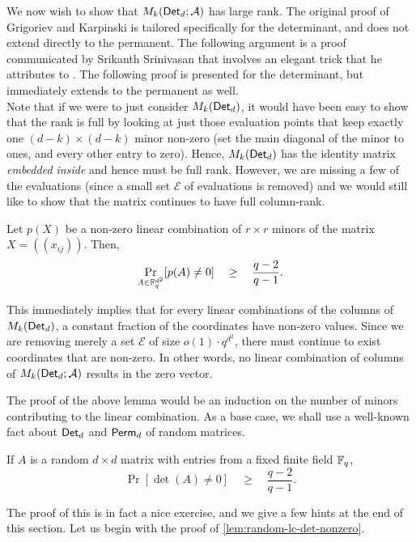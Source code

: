 We now wish to show that $M_k(\operatorname{\mathsf{Det}}_d;\mathcal{A})$ has large rank. 
The
original proof of Grigoriev and Karpinski is tailored specifically for
the determinant, and does not extend directly to the permanent. 
The
following argument is a proof communicated by Srikanth Srinivasan
\cite{Srikanth13} that involves an elegant trick that he attributes to
\cite{Koutis08}. 
The following proof is presented for the determinant,
but immediately extends to the permanent as well. \\


Note that if we were to just consider $M_k(\operatorname{\mathsf{Det}}_d)$, it would have
been easy to show that the rank is full by looking at just those
evaluation points that keep exactly one $(d-k)\times (d-k)$ minor
non-zero (set the main diagonal of the minor to ones, and every other
entry to zero). 
Hence, $M_k(\operatorname{\mathsf{Det}}_d)$ has the identity matrix
\emph{embedded inside} and hence must be full rank. 
However, we are
missing a few of the evaluations (since a small set $\mathcal{E}$ of
evaluations is removed) and we would still like to show that the
matrix continues to have full column-rank.

\begin{lemma}\label{lem:random-lc-det-nonzero}
  Let $p(X)$ be a non-zero linear combination of $r\times r$
  minors of the matrix $X = (\!(x_{ij})\!)$. 
Then, 
  $$
  \Pr_{A\in \mathbb{F}_q^{d^2}}[p(A) \neq 0] \quad \geq \quad \frac{q-2}{q-1}.
  $$
\end{lemma}

This immediately implies that for every linear combinations of the
columns of $M_k(\operatorname{\mathsf{Det}}_d)$, a constant fraction of the coordinates have
non-zero values. 
Since we are removing merely a set $\mathcal{E}$ of
size $o(1) \cdot q^{d^2}$, there must continue to exist coordinates that
are non-zero. 
In other words, no linear combination of columns of
$M_k(\operatorname{\mathsf{Det}}_d;\mathcal{A})$ results in the zero vector.


The proof of the above lemma would be an induction on the number of
minors contributing to the linear combination. 
As a base case, we
shall use a well-known fact about $\operatorname{\mathsf{Det}}_d$ and $\operatorname{\mathsf{Perm}}_d$ of random
matrices.

\begin{proposition}\label{prop:random-det-nonzero}
  If $A$ is a random $d\times d$ matrix with entries from a fixed
  finite field $\mathbb{F}_q$, 
$$
\Pr[\det(A) \neq 0] \quad\geq\quad \frac{q-2}{q-1}.
$$
\end{proposition}

The proof of this is in fact a nice exercise, and we give a few hints
at the end of this section. 
Let us begin with the proof of
\autoref{lem:random-lc-det-nonzero}.


